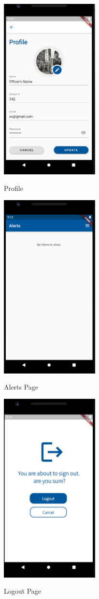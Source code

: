 \documentclass[12pt]{article}
\begin{document}
\FloatBarrier
\begin{figure}[h]
  \centering
  \includegraphics[width=5cm]{profile.PNG}
  \label{fig:2}
   \caption{Profile}
\end{figure}
\FloatBarrier
\begin{figure}[h]
  \centering
  \includegraphics[width=5cm]{Alerts.PNG}
  \label{fig:2}
   \caption{Alerts Page}
\end{figure}
\FloatBarrier
\begin{figure}[h]
  \centering
  \includegraphics[width=5cm]{Logout.PNG}
  \label{fig:2}
   \caption{Logout Page}
\end{figure}
\end{document}
